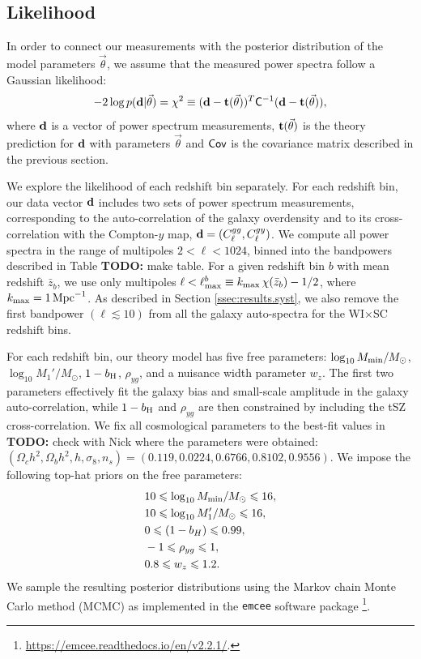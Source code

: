\documentclass[useAMS,usenatbib]{mn2e}
\newcommand{\todo}[1]{{\bf TODO:} #1}
\begin{document}
  \subsection{Likelihood}\label{ssec:methods.like}
    In order to connect our measurements with the posterior distribution of the model parameters $\vec{\theta}$, we assume that the measured power spectra follow a Gaussian likelihood:
    \begin{equation}
      -2\log p({\bf d}|\vec{\theta}) = \chi^2\equiv ({\bf d}-{\bf t}(\vec{\theta}))^T {\sf C}^{-1} ({\bf d}-{\bf t}(\vec{\theta})),
    \end{equation}
    where ${\bf d}$ is a vector of power spectrum measurements, ${\bf t}(\vec{\theta})$ is the theory prediction for ${\bf d}$ with parameters $\vec{\theta}$ and ${\sf Cov}$ is the covariance matrix described in the previous section.

    We explore the likelihood of each redshift bin separately. For each redshift bin, our data vector ${\bf d}$ includes two sets of power spectrum measurements, corresponding to the auto-correlation of the galaxy overdensity and to its cross-correlation with the Compton-$y$ map, ${\bf d}=(C^{gg}_\ell,C^{gy}_\ell)$. We compute all power spectra in the range of multipoles $2<\ell<1024$, binned into the bandpowers described in Table \todo{make table}. For a given redshift bin $b$ with mean redshift $\bar{z}_b$, we use only multipoles $\ell<\ell^b_{\rm max}\equiv k_{\rm max}\,\chi(\bar{z}_b)-1/2$, where $k_{\rm max}=1\,{\rm Mpc}^{-1}$. As described in Section \ref{ssec:results.syst}, we also remove the first bandpower $(\ell\lesssim10)$ from all the galaxy auto-spectra for the WI$\times$SC redshift bins.

    For each redshift bin, our theory model has five free parameters: $\log_{10}M_{\rm min}/M_\odot$, $\log_{10}M_1'/M_\odot$, $1-b_{\rm H}$, $\rho_{yg}$, and a nuisance width parameter $w_z$. The first two parameters effectively fit the galaxy bias and small-scale amplitude in the galaxy auto-correlation, while $1-b_{\rm H}$ and $\rho_{yg}$ are then constrained by including the tSZ cross-correlation. We fix all cosmological parameters to the best-fit values in \todo{check with Nick where the parameters were obtained}: $(\Omega_c h^2,\Omega_bh^2,h,\sigma_8,n_s)=(0.119,0.0224,0.6766,0.8102,0.9556)$. We impose the following top-hat priors on the free parameters:
    \begin{align}
      &10\le\log_{10}M_{\rm min}/M_\odot\le16,\\
      &10\le\log_{10}M_1'/M_\odot\le16,\\
      &0\le(1-b_H)\le0.99,\\
      &-1\le\rho_{yg}\le1,\\
      &0.8\le w_z\le1.2.
    \end{align}
    We sample the resulting posterior distributions using the Markov chain Monte Carlo method (MCMC) as implemented in the {\tt emcee} software package \citep{2013PASP..125..306F}\footnote{\url{https://emcee.readthedocs.io/en/v2.2.1/}.}.
\end{document}
